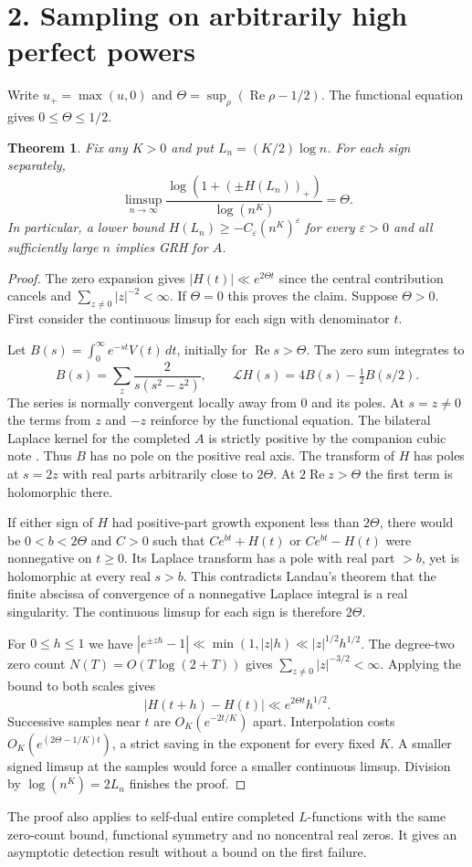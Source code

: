 \documentclass[11pt]{article}
\newtheorem*{theorem}{Theorem}
\newcommand{\Rea}{\operatorname{Re}}
\begin{document}
\newpage
\section*{2. Sampling on arbitrarily high perfect powers}
Write $u_+=\max(u,0)$ and $\Theta=\sup_\rho(\Rea\rho-1/2)$. The functional
equation gives $0\le\Theta\le1/2$.
\begin{theorem}
Fix any $K>0$ and put $L_n=(K/2)\log n$. For each sign separately,
\[
 \boxed{\displaystyle
 \limsup_{n\to\infty}
 \frac{\log(1+(\pm H(L_n))_+)}{\log(n^K)}=\Theta .}
\]
In particular, a lower bound $H(L_n)\ge-C_\varepsilon(n^K)^\varepsilon$
for every $\varepsilon>0$ and all sufficiently large $n$ implies GRH for $A$.
\end{theorem}
\begin{proof}
The zero expansion gives $|H(t)|\ll e^{2\Theta t}$ since the central
contribution cancels and $\sum_{z\ne0}|z|^{-2}<\infty$. If $\Theta=0$ this
proves the claim. Suppose $\Theta>0$. First consider the continuous limsup
for each sign with denominator $t$.

Let $B(s)=\int_0^\infty e^{-st}V(t)\,dt$, initially for $\Rea s>\Theta$.
The zero sum integrates to
\[
 B(s)=\sum_z\frac{2}{s(s^2-z^2)},\qquad
 \mathcal L H(s)=4B(s)-\tfrac12 B(s/2).
\]
The series is normally convergent locally away from $0$ and its poles.
At $s=z\ne0$ the terms from $z$ and $-z$ reinforce by the functional
equation. The bilateral Laplace kernel for the completed $A$ is strictly
positive by the companion cubic note \cite{cubic}. Thus $B$ has no pole
on the positive real axis. The transform of $H$ has poles at $s=2z$ with
real parts arbitrarily close to $2\Theta$. At $2\Rea z>\Theta$ the first
term is holomorphic there.

If either sign of $H$ had positive-part growth exponent less than $2\Theta$,
there would be $0<b<2\Theta$ and $C>0$ such that $Ce^{bt}+H(t)$ or
$Ce^{bt}-H(t)$ were nonnegative on $t\ge0$. Its Laplace transform has a
pole with real part $>b$, yet is holomorphic at every real $s>b$. This
contradicts Landau's theorem that the finite abscissa of convergence of a
nonnegative Laplace integral is a real singularity. The continuous limsup
for each sign is therefore $2\Theta$.

For $0\le h\le1$ we have
$|e^{\pm zh}-1|\ll\min(1,|z|h)\ll |z|^{1/2}h^{1/2}$.
The degree-two zero count $N(T)=O(T\log(2+T))$ gives
$\sum_{z\ne0}|z|^{-3/2}<\infty$. Applying the bound to both scales gives
\[
 |H(t+h)-H(t)|\ll e^{2\Theta t}h^{1/2}.
\]
Successive samples near $t$ are $O_K(e^{-2t/K})$ apart. Interpolation
costs $O_K(e^{(2\Theta-1/K)t})$, a strict saving in the exponent for
every fixed $K$. A smaller signed limsup at the samples would force a
smaller continuous limsup. Division by $\log(n^K)=2L_n$ finishes the proof.
\end{proof}
The proof also applies to self-dual entire completed $L$-functions with
the same zero-count bound, functional symmetry and no noncentral real zeros.
It gives an asymptotic detection result without a bound on the first failure.
\end{document}
